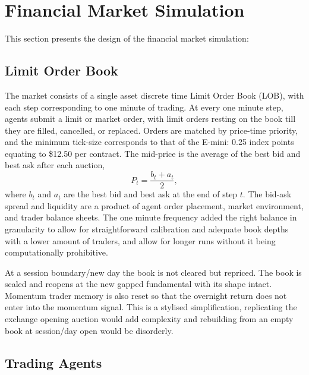 \section{Financial Market Simulation}
\label{sec:model-market}

This section presents the design of the financial market simulation:

\subsection{Limit Order Book}

The market consists of a single asset discrete time Limit Order Book (LOB), with each step corresponding to one minute of trading. At every one minute step, agents submit a limit or market order, with limit orders resting on the book till they are filled, cancelled, or replaced. Orders are matched by price-time priority, and the minimum tick-size corresponds to that of the E-mini: 0.25 index points equating to \$12.50 per contract. The mid-price is the average of the best bid and best ask after each auction,
\begin{equation}
  P_t = \frac{b_t + a_t}{2},
\end{equation}
where $b_t$ and $a_t$ are the best bid and best ask at the end of step $t$. The bid-ask spread and liquidity are a product of agent order placement, market environment, and trader balance sheets. The one minute frequency added the right balance in granularity to allow for straightforward calibration and adequate book depths with a lower amount of traders, and allow for longer runs without it being computationally prohibitive.

At a session boundary/new day the book is not cleared but repriced. The book is scaled and reopens at the new gapped fundamental with its shape intact. Momentum trader memory is also reset so that the overnight return does not enter into the momentum signal. This is a stylised simplification, replicating the exchange opening auction would add complexity and rebuilding from an empty book at session/day open would be disorderly. 

\subsection{Trading Agents}
\label{sec:agents}

